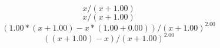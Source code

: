 \documentclass{article}
\begin{document}
\begin{equation}
x/(x+1.00)
\end{equation}
\begin{equation}
x/(x+1.00)
\end{equation}
\begin{equation}
(1.00*(x+1.00)-x*(1.00+0.00))/(x+1.00)^2.00
\end{equation}
\begin{equation}
((x+1.00)-x)/(x+1.00)^2.00
\end{equation}
\end{document}

